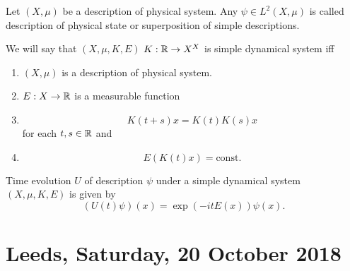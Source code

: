 \documentclass[main.tex]{subfiles}
\begin{document}
\begin{definition}
Let $(X,\mu)$ be a description of physical system. Any $\psi\in L^2(X,\mu)$ is called description of physical state or superposition of simple descriptions.
\end{definition}
\begin{definition}
We will say that $(X, \mu, K, E)$ $K:\mathbb{R} \to X^X$ is simple dynamical system iff
\begin{enumerate}
\item $(X, \mu)$ is a description of physical system.
\item $E:X\to\mathbb{R}$ is a measurable function
\item
\begin{equation}
	K(t + s)x = K(t)K(s)x
\end{equation}
for each $t,s\in\mathbb{R}$ and
\item
\begin{equation}
E(K(t)x) = \text{const}.
\end{equation}
\end{enumerate}
\end{definition}

\begin{axiom}
Time evolution $U$ of description $\psi$ under a simple dynamical system $(X, \mu, K, E)$ is given by
\begin{equation}
(U(t)\psi)(x) =  \exp(-itE(x))\psi(x).
\end{equation}
\end{axiom}   

\section{Leeds, Saturday, 20 October 2018}
\end{document}
